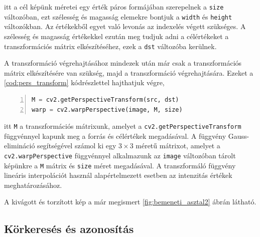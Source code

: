 \par itt a cél képünk méretei egy érték páros formájában szerepelnek a \lstinline{size} változóban, ezt szélesség és magasság elemekre bontjuk a \lstinline{width} és \lstinline{height} változókban. Az értékekből egyet való levonás az indexelés végett szükséges. A szélesség és magasság értékekkel ezután meg tudjuk adni a célértékeket a transzformációs mátrix elkészítéséhez, ezek a \lstinline{dst} változóba kerülnek.
\par A transzformáció végrehajtásához mindezek után már csak a transzformációs mátrix elkészítésére van szükség, majd a transzformáció végrehajtására.
\newline Ezeket a \ref{cod:pers_transform} kódrészlettel hajthatjuk végre,

\vspace{2mm}
\hspace{-10mm}
\begin{minipage}{\linewidth}
\begin{lstlisting}[language=Python, numbers=left, caption={A transzformáció végrehajtása.}, label={cod:pers_transform}]
M = cv2.getPerspectiveTransform(src, dst)
warp = cv2.warpPerspective(image, M, size)
\end{lstlisting}
\end{minipage}

\par itt \lstinline{M} a transzformációs mátrixunk, amelyet a \lstinline{cv2.getPerspectiveTransform} függvénnyel \cite{opencv_docs} kapunk meg a forrás és célértékek megadásával. A függvény Gauss-elimináció \cite{grcar2011mathematicians} segítségével számol ki egy $3\times3$ méretű mátrixot, amelyet a \lstinline{cv2.warpPerspective} függvénnyel \cite{opencv_docs} alkalmazunk az \lstinline{image} változóban tárolt képünkre a \lstinline{M} mátrix és \lstinline{size} méret megadásával. A transzformáló függvény lineáris interpolációt \cite{blu0401interpolation} használ alapértelmezett esetben az intenzitás értékek meghatározásához.
\par A kivágott és torzított kép a már megismert \ref{fig:bemeneti_asztal2} ábrán látható.

\subsection{Körkeresés és azonosítás}